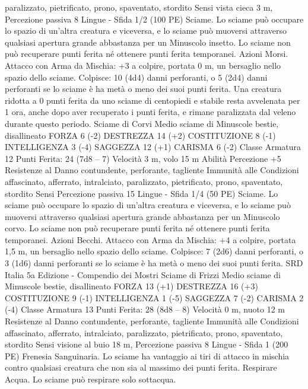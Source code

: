 \begin{multicols}{2}
paralizzato, pietrificato, prono, spaventato, stordito
Sensi vista cieca 3 m, Percezione passiva 8
Lingue -
Sfida 1/2 (100 PE)
Sciame. Lo sciame può occupare lo spazio di un’altra creatura e
viceversa, e lo sciame può muoversi attraverso qualsiasi apertura
grande abbastanza per un Minuscolo insetto. Lo sciame non può
recuperare punti ferita né ottenere punti ferita temporanei.
Azioni
Morsi. Attacco con Arma da Mischia: +3 a colpire, portata 0 m,
un bersaglio nello spazio dello sciame.
Colpisce: 10 (4d4) danni perforanti, o 5 (2d4) danni perforanti se
lo sciame è ha metà o meno dei suoi punti ferita. Una creatura
ridotta a 0 punti ferita da uno sciame di centopiedi e stabile resta
avvelenata per 1 ora, anche dopo aver recuperato i punti ferita, e
rimane paralizzata dal veleno durante questo periodo.
Sciame di Corvi
Medio sciame di Minuscole bestie, disallineato
FORZA 6 (-2)
DESTREZZA 14 (+2)
COSTITUZIONE 8 (-1)
INTELLIGENZA 3 (-4)
SAGGEZZA 12 (+1)
CARISMA 6 (-2)
Classe Armatura 12
\hspace*{0pt}\hfill{Punti Ferita}: 24 (7d8 – 7)
Velocità 3 m, volo 15 m
Abilità Percezione +5
Resistenze al Danno contundente, perforante, tagliente
Immunità alle Condizioni affascinato, afferrato, intralciato,
paralizzato, pietrificato, prono, spaventato, stordito
Sensi Percezione passiva 15
Lingue -
Sfida 1/4 (50 PE)
Sciame. Lo sciame può occupare lo spazio di un’altra creatura e
viceversa, e lo sciame può muoversi attraverso qualsiasi apertura
grande abbastanza per un Minuscolo corvo. Lo sciame non può
recuperare punti ferita né ottenere punti ferita temporanei.
Azioni
Becchi. Attacco con Arma da Mischia: +4 a colpire, portata 1,5
m, un bersaglio nello spazio dello sciame.
Colpisce: 7 (2d6) danni perforanti, o 3 (1d6) danni perforanti se
lo sciame è ha metà o meno dei suoi punti ferita.
SRD Italia 5a Edizione - Compendio dei Mostri
Sciame di Frizzi
Medio sciame di Minuscole bestie, disallineato
FORZA 13 (+1)
DESTREZZA 16 (+3)
COSTITUZIONE 9 (-1)
INTELLIGENZA 1 (-5)
SAGGEZZA 7 (-2)
CARISMA 2 (-4)
Classe Armatura 13
\hspace*{0pt}\hfill{Punti Ferita}: 28 (8d8 – 8)
Velocità 0 m, nuoto 12 m
Resistenze al Danno contundente, perforante, tagliente
Immunità alle Condizioni affascinato, afferrato, intralciato,
paralizzato, pietrificato, prono, spaventato, stordito
Sensi visione al buio 18 m, Percezione passiva 8
Lingue -
Sfida 1 (200 PE)
Frenesia Sanguinaria. Lo sciame ha vantaggio ai tiri di attacco
in mischia contro qualsiasi creatura che non sia al massimo dei
punti ferita.
Respirare Acqua. Lo sciame può respirare solo sottacqua.

\end{multicols}
